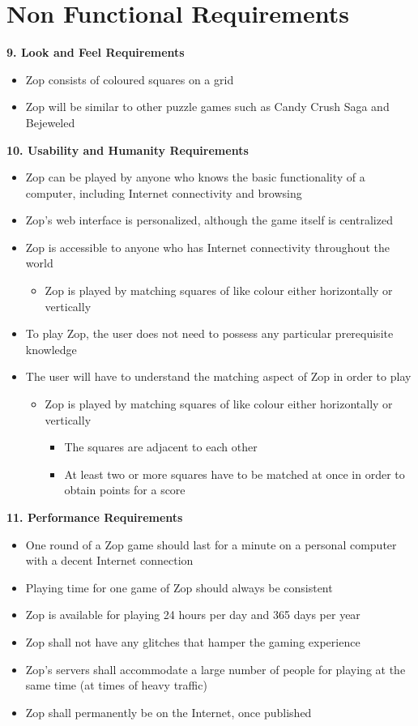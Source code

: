 \documentclass[12pt]{article}
\begin{document}
\section*{Non Functional Requirements}
\textbf{9. Look and Feel Requirements}\\
\begin{itemize}
 \item Zop consists of coloured squares on a grid
 \item Zop will be similar to other puzzle games such as Candy Crush Saga and Bejeweled
\end{itemize}
\textbf{10. Usability and Humanity Requirements}\\
\begin{itemize}
 \item Zop can be played by anyone who knows the basic functionality of a computer, including Internet connectivity and browsing
 \item Zop's web interface is personalized, although the game itself is centralized
 \item Zop is accessible to anyone who has Internet connectivity throughout the world
 \begin{itemize}
  \item Zop is played by matching squares of like colour either horizontally or vertically
 \end{itemize}
 \item To play Zop, the user does not need to possess any particular prerequisite knowledge
 \item The user will have to understand the matching aspect of Zop in order to play
 \begin{itemize}
  \item Zop is played by matching squares of like colour either horizontally or vertically
  \begin{itemize}
   \item The squares are adjacent to each other
   \item At least two or more squares have to be matched at once in order to obtain points for a score
  \end{itemize}
 \end{itemize}
\end{itemize}
\textbf{11. Performance Requirements}\\
\begin{itemize}
 \item One round of a Zop game should last for a minute on a personal computer with a decent Internet connection
 \item Playing time for one game of Zop should always be consistent
 \item Zop is available for playing 24 hours per day and 365 days per year
 \item Zop shall not have any glitches that hamper the gaming experience
 \item Zop’s servers shall accommodate a large number of people for playing at the same time (at times of heavy traffic)
 \item Zop shall permanently be on the Internet, once published
\end{itemize}
\end{document}
